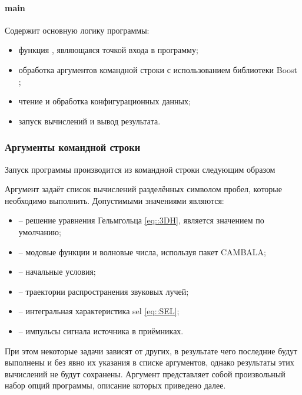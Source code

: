 \documentclass[../document.tex]{subfiles}
\begin{document}
                \paragraph{main}
                    \par Содержит основную логику программы:
                    \begin{itemize}
                        \item функция , являющаяся точкой входа в программу;
                        \item обработка аргументов командной строки с использованием библиотеки Boost \cite{boost};
                        \item чтение и обработка конфигурационных данных;
                        \item запуск вычислений и вывод результата.
                    \end{itemize}
            \subsubsection{Аргументы командной строки\label{sec::command_line_args}}
                \par Запуск программы производится из командной строки следующим образом \centerline{} Аргумент  задаёт список вычислений разделённых символом пробел, которые необходимо выполнить. Допустимыми значениями являются:
                \begin{itemize}
                    \item{} -- решение уравнения Гельмгольца \eqref{eq::3DH}, является значением по умолчанию;
                    \item{} --  модовые функции и волновые числа, используя пакет CAMBALA;
                    \item{} -- начальные условия;
                    \item{} -- траектории распространения звуковых лучей;
                    \item{} -- интегральная характеристика \acrshort{sel} \eqref{eq::SEL};
                    \item{} -- импульсы сигнала источника в приёмниках.
                \end{itemize}
                При этом некоторые задачи зависят от других, в результате чего последние будут выполнены и без явно их указания в списке аргументов, однако результаты этих вычислений не будут сохранены. Аргумент  представляет собой произвольный набор опций программы, описание которых приведено далее.
\end{document}
